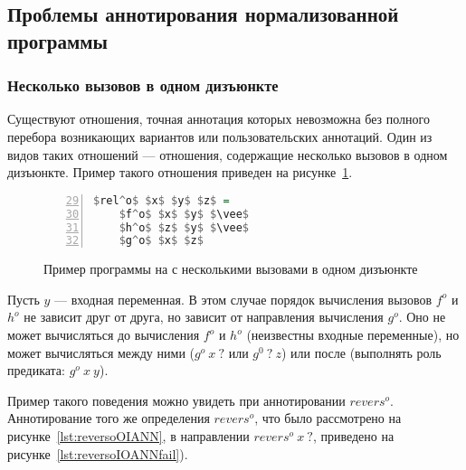 \subsection{Проблемы аннотирования нормализованной программы}
\label{lab:problems}


\subsubsection{Несколько вызовов в одном дизъюнкте}
\label{lab:disjPerm}

Существуют отношения, точная аннотация которых невозможна без полного перебора возникающих вариантов или пользовательских аннотаций. 
Один из видов таких отношений --- отношения, содержащие несколько вызовов в одном дизъюнкте.
Пример такого отношения приведен на рисунке~\ref{lst:reloDEF}.

\begin{figure}[h!]
  \begin{center}
  \begin{minipage}{0.18\textwidth}
  \begin{lstlisting}[language=Haskell, frame=single, numbers=left,numberstyle=\small, firstnumber=29, escapechar=|]
  $rel^o$ $x$ $y$ $z$ =
    $f^o$ $x$ $y$ $\vee$
    $h^o$ $z$ $y$ $\vee$
    $g^o$ $x$ $z$
    \end{lstlisting}
  \end{minipage}
  \end{center}
  \caption{Пример программы на \miniKanren{} с несколькими вызовами в одном дизъюнкте}
  \label{lst:reloDEF}
\end{figure}

Пусть $y$ --- входная переменная.
В этом случае порядок вычисления вызовов $f^o$ и $h^o$ не зависит друг от друга, но зависит от направления вычисления $g^o$.
Оно не может вычисляться до вычисления $f^o$ и $h^o$ (неизвестны входные переменные), но может вычисляться между ними ($g^o \ x \ ?$ или $g^0 \ ? \ z$) или после (выполнять роль предиката: $g^o \ x \ y$).

Пример такого поведения можно увидеть при аннотировании $revers^o$.
Аннотирование того же определения $revers^o$, что было рассмотрено на рисунке~\ref{lst:reversoOIANN}, в направлении $revers^o \ x \ ?$, приведено на рисунке~\ref{lst:reversoIOANNfail}).

